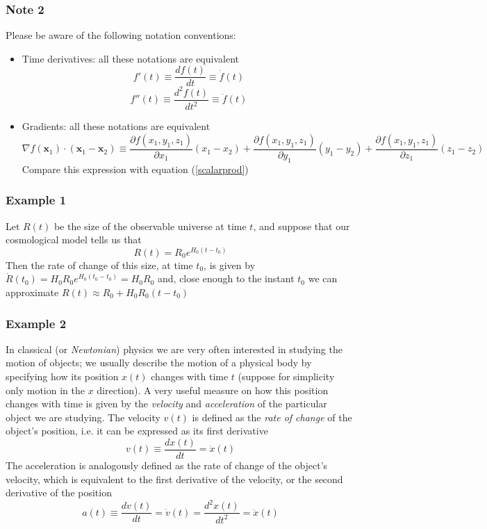 \documentclass[11pt, a4paper,oneside,openright]{book}
\numberwithin{equation}{section}
\begin{document}
\subsubsection{Note 2}
Please be aware of the following notation conventions:
\begin{itemize}
\item Time derivatives: all these notations are equivalent
\begin{equation}
f'(t)\equiv \frac{df(t)}{dt} \equiv \dot{f}(t)
\end{equation}
\begin{equation}
f''(t)\equiv \frac{d^2f(t)}{dt^2}\equiv \ddot{f}(t)
\end{equation}
\item Gradients: all these notations are equivalent 
\begin{equation}
\nabla f(\mathbf{x}_1)\cdot(\mathbf{x}_1-\mathbf{x}_2)\equiv \frac{\partial f(x_1,y_1,z_1)}{\partial x_1}(x_1-x_2)+\frac{\partial f(x_1,y_1,z_1)}{\partial y_1}(y_1-y_2)+\frac{\partial f(x_1,y_1,z_1)}{\partial z_1}(z_1-z_2)
\end{equation}
Compare this expression with equation (\ref{scalarprod})
\end{itemize}
\subsubsection{Example 1}
Let $R(t)$ be the size of the observable universe at time $t$, and suppose that our cosmological model tells us that 
\begin{equation}
R(t)=R_0e^{H_0(t-t_0)}
\end{equation}
Then the rate of change of this size, at time $t_0$, is given by $\dot{R}(t_0)=H_0R_0e^{H_0(t_0-t_0)}=H_0R_0$ and, close enough to the instant $t_0$ we can approximate $R(t)\approx R_0+H_0R_0(t-t_0)$
\subsubsection{Example 2}
In classical (or \textit{Newtonian}) physics we are very often interested in studying the motion of objects; we usually describe the motion of a physical body by specifying how its position $x(t)$ changes with time $t$ (suppose for simplicity only motion in the $x$ direction). A very useful measure on how this position changes with time is given by the \textit{velocity} and \textit{acceleration} of the particular object we are studying. The velocity $v(t)$ is defined as the \textit{rate of change} of the object's position, i.e. it can be expressed as its first derivative 
\begin{equation}
v(t)\equiv\frac{dx(t)}{dt}=\dot{x}(t)
\end{equation}
The acceleration is analogously defined as the rate of change of the object's velocity, which is equivalent to the first derivative of the velocity, or the second derivative of the position
\begin{equation}
a(t)\equiv \frac{dv(t)}{dt}=\dot{v}(t)=\frac{d^2x(t)}{dt^2}=\ddot{x}(t)
\end{equation}
\end{document}
